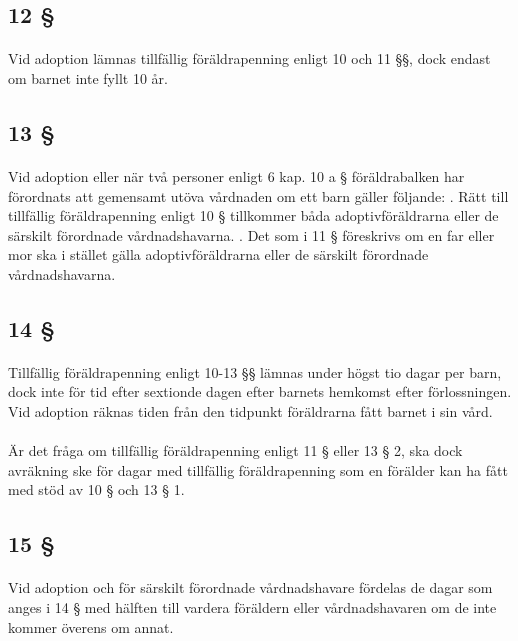 \documentclass[a4paper,notitlepage,openany,10pt]{book}
\begin{document}
\subsection*{12 §}
\paragraph*{}
Vid adoption lämnas tillfällig föräldrapenning enligt 10 och 11 §§, dock endast om barnet inte fyllt 10 år.
\subsection*{13 §}
\paragraph*{}
Vid adoption eller när två personer enligt 6 kap. 10 a § föräldrabalken har förordnats att gemensamt utöva vårdnaden om ett barn gäller följande:
. Rätt till tillfällig föräldrapenning enligt 10 § tillkommer båda adoptivföräldrarna eller de särskilt förordnade vårdnadshavarna.
. Det som i 11 § föreskrivs om en far eller mor ska i stället gälla adoptivföräldrarna eller de särskilt förordnade vårdnadshavarna.
\subsection*{14 §}
\paragraph*{}
Tillfällig föräldrapenning enligt 10-13 §§ lämnas under högst tio dagar per barn, dock inte för tid efter sextionde dagen efter barnets hemkomst efter förlossningen. Vid adoption räknas tiden från den tidpunkt föräldrarna fått barnet i sin vård.
\paragraph*{}
Är det fråga om tillfällig föräldrapenning enligt 11 § eller 13 § 2, ska dock avräkning ske för dagar med tillfällig föräldrapenning som en förälder kan ha fått med stöd av 10 § och 13 § 1.
\subsection*{15 §}
\paragraph*{}
Vid adoption och för särskilt förordnade vårdnadshavare fördelas de dagar som anges i 14 § med hälften till vardera föräldern eller vårdnadshavaren om de inte kommer överens om annat.
\end{document}
